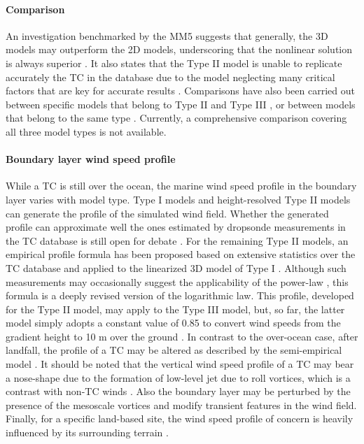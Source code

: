 \paragraph{Comparison} An investigation benchmarked by the MM5 \citep{liu1997multiscale} suggests that generally, the 3D models may outperform the 2D models, underscoring that the nonlinear solution is always superior \citep{kepert2010slab-i,kepert2010slab-ii, kepert2014reply}. It also states that the Type II model is unable to replicate accurately the TC in the database due to the model neglecting many critical factors that are key for accurate results \citep{kepert2010slab-i}. Comparisons have also been carried out between specific models that belong to Type II and Type III \citep{smith2008critique}, or between models that belong to the same type \citep{snaiki2017linear, wills2000review}. Currently, a comprehensive comparison covering all three model types is not available. 

\paragraph{Boundary layer wind speed profile} While a TC is still over the ocean, the marine wind speed profile in the boundary layer varies with model type. Type I models and height-resolved Type II models can generate the profile of the simulated wind field. Whether the generated profile can approximate well the ones estimated by dropsonde measurements in the TC database is still open for debate \citep{kepert2001dynamics-ii, kepert2011choosing, kepert2013how, montgomery2014comments, smith1968surface}. For the remaining Type II models, an empirical profile formula has been proposed based on extensive statistics over the TC database and applied to the linearized 3D model of Type I \citep{vickery2009hurricane-b}. Although such measurements may occasionally suggest the applicability of the power-law \citep{song2016characteristics}, this formula is a deeply revised version of the logarithmic law. This profile, developed for the Type II model, may apply to the Type III model, but, so far, the latter model simply adopts a constant value of 0.85 to convert wind speeds from the gradient height to 10 m over the ground \citep{chavas2015model}. In contrast to the over-ocean case, after landfall, the profile of a TC may be altered as described by the semi-empirical model \citep{snaiki2018semiempirical}. It should be noted that the vertical wind speed profile of a TC may bear a nose-shape due to the formation of low-level jet due to roll vortices, which is a contrast with non-TC winds \citep{li2015comparative, li2019observed}. Also the boundary layer may be perturbed by the presence of the mesoscale vortices and modify transient features in the wind field. Finally, for a specific land-based site, the wind speed profile of concern is heavily influenced by its surrounding terrain \citep{huang2013prediction}.

